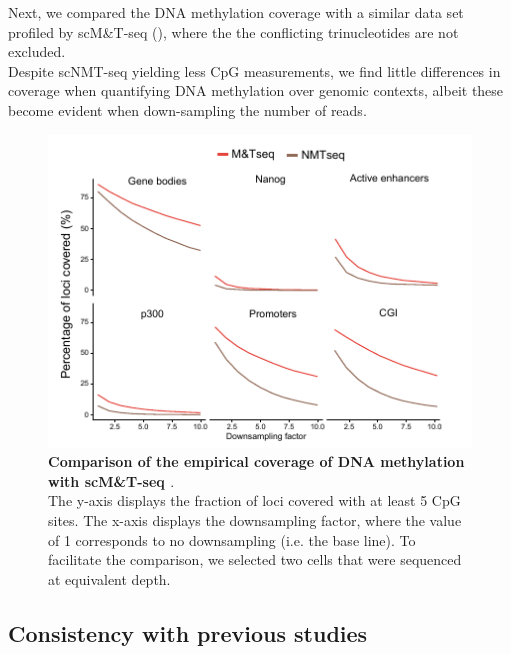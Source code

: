 Next, we compared the DNA methylation coverage with a similar data set profiled by scM\&T-seq \cite{Angermueller2016} (), where the the conflicting trinucleotides are not excluded.\\
Despite scNMT-seq yielding less CpG measurements, we find little differences in coverage when quantifying DNA methylation over genomic contexts, albeit these become evident when down-sampling the number of reads.

\begin{figure}[H]
	\centering
	\includegraphics[width=0.8\linewidth]{scNMT_coverage2}
	\caption[]{\textbf{Comparison of the empirical coverage of DNA methylation with scM\&T-seq \cite{Angermueller2016}}.\\
	The y-axis displays the fraction of loci covered with at least 5 CpG sites. The x-axis displays the downsampling factor, where the value of 1 corresponds to no downsampling (i.e. the base line). To facilitate the comparison, we selected two cells that were sequenced at equivalent depth.}
	\label{fig:scnmt_coverage2}
\end{figure}

\subsection{Consistency with previous studies}


